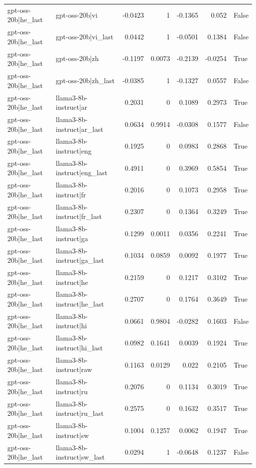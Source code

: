 \begin{table}
\begin{tabular}{l l r r r r l}
gpt-oss-20b|he_last & gpt-oss-20b|vi & -0.0423 & 1 & -0.1365 & 0.052 & False \\
gpt-oss-20b|he_last & gpt-oss-20b|vi_last & 0.0442 & 1 & -0.0501 & 0.1384 & False \\
gpt-oss-20b|he_last & gpt-oss-20b|zh & -0.1197 & 0.0073 & -0.2139 & -0.0254 & True \\
gpt-oss-20b|he_last & gpt-oss-20b|zh_last & -0.0385 & 1 & -0.1327 & 0.0557 & False \\
gpt-oss-20b|he_last & llama3-8b-instruct|ar & 0.2031 & 0 & 0.1089 & 0.2973 & True \\
gpt-oss-20b|he_last & llama3-8b-instruct|ar_last & 0.0634 & 0.9914 & -0.0308 & 0.1577 & False \\
gpt-oss-20b|he_last & llama3-8b-instruct|eng & 0.1925 & 0 & 0.0983 & 0.2868 & True \\
gpt-oss-20b|he_last & llama3-8b-instruct|eng_last & 0.4911 & 0 & 0.3969 & 0.5854 & True \\
gpt-oss-20b|he_last & llama3-8b-instruct|fr & 0.2016 & 0 & 0.1073 & 0.2958 & True \\
gpt-oss-20b|he_last & llama3-8b-instruct|fr_last & 0.2307 & 0 & 0.1364 & 0.3249 & True \\
gpt-oss-20b|he_last & llama3-8b-instruct|ga & 0.1299 & 0.0011 & 0.0356 & 0.2241 & True \\
gpt-oss-20b|he_last & llama3-8b-instruct|ga_last & 0.1034 & 0.0859 & 0.0092 & 0.1977 & True \\
gpt-oss-20b|he_last & llama3-8b-instruct|he & 0.2159 & 0 & 0.1217 & 0.3102 & True \\
gpt-oss-20b|he_last & llama3-8b-instruct|he_last & 0.2707 & 0 & 0.1764 & 0.3649 & True \\
gpt-oss-20b|he_last & llama3-8b-instruct|hi & 0.0661 & 0.9804 & -0.0282 & 0.1603 & False \\
gpt-oss-20b|he_last & llama3-8b-instruct|hi_last & 0.0982 & 0.1641 & 0.0039 & 0.1924 & True \\
gpt-oss-20b|he_last & llama3-8b-instruct|raw & 0.1163 & 0.0129 & 0.022 & 0.2105 & True \\
gpt-oss-20b|he_last & llama3-8b-instruct|ru & 0.2076 & 0 & 0.1134 & 0.3019 & True \\
gpt-oss-20b|he_last & llama3-8b-instruct|ru_last & 0.2575 & 0 & 0.1632 & 0.3517 & True \\
gpt-oss-20b|he_last & llama3-8b-instruct|sw & 0.1004 & 0.1257 & 0.0062 & 0.1947 & True \\
gpt-oss-20b|he_last & llama3-8b-instruct|sw_last & 0.0294 & 1 & -0.0648 & 0.1237 & False \\

\end{tabular}
\end{table}
